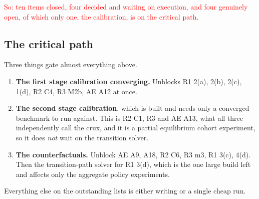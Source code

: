\documentclass[11pt]{article}
\newcommand{\nw}[1]{\textcolor{red}{#1}}
\begin{document}
\nw{So: ten items closed, four decided and waiting on execution, and four
genuinely open, of which only one, the calibration, is on the critical path.}

\subsection{The critical path}

Three things gate almost everything above.

\begin{enumerate}
\item \textbf{The first stage calibration converging.} Unblocks R1 2(a), 2(b),
2(c), 1(d), R2 C4, R3 M2b, AE A12 at once.
\item \textbf{The second stage calibration}, which is built and needs only a
converged benchmark to run against. This is R2 C1, R3 and AE A13, what all
three independently call the crux, and it is a partial equilibrium cohort
experiment, so it does \emph{not} wait on the transition solver.
\item \textbf{The counterfactuals.} Unblock AE A9, A18, R2 C6, R3 m3, R1 3(c),
4(d). Then the transition-path solver for R1 3(d), which is the one large
build left and affects only the aggregate policy experiments.
\end{enumerate}

Everything else on the outstanding lists is either writing or a single cheap run.
\end{document}
